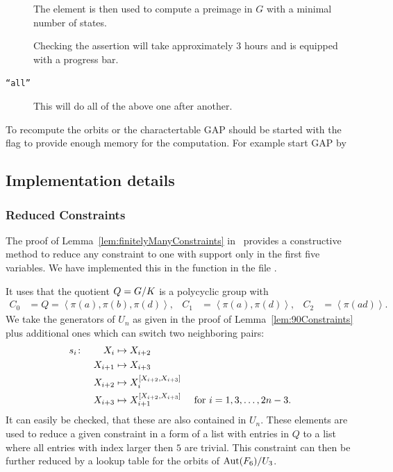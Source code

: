 \documentclass[a4paper,11pt]{amsart}
\begin{document}
\begin{description}
		      The element is then used to compute a preimage in $G$ with a minimal 
		      number of states.

		      Checking the assertion will take approximately $3$ hours and is equipped 
		      with a progress bar. 
  \item [\texttt{``all''}] This will do all of the above one after another.		      
   \end{description}
To recompute the orbits or the charactertable GAP should be 
started with the  flag
to provide enough memory for the computation. For example start GAP by 


\subsection{Implementation details}
\label{sec:gap_details}
\subsubsection{Reduced Constraints}
The proof of Lemma~\ref{lem:finitelyManyConstraints} in~\cite{Lysenok-Miasnikov-Ushakov:QuadraticEquationsInGrig} 
provides a constructive method to reduce any constraint to one with support
only in the first five variables. 
We have implemented this in the function  in the file
.

It uses that the quotient $Q={G/K}$ is a polycyclic group with 
\begin{align*}
 C_0 &= Q = \left<\pi(a),\pi(b),\pi(d)\right>, &
 C_1 &= \left<\pi(a),\pi(d)\right>, &
 C_2 &= \left<\pi(ad)\right>.
\end{align*}
We take the generators of $U_n$ as given in the proof of
 Lemma~\ref{lem:90Constraints}
plus additional ones which can switch two neighboring pairs:
\begin{align*}
 s_i &\colon &X_i&\mapsto X_{i+2}&\\
	    &&X_{i+1}&\mapsto X_{i+3}&\\
	    &&X_{i+2}&\mapsto X_{i}^{[X_{i+2},X_{i+3}]}&\\
	    &&X_{i+3}&\mapsto X_{i+1}^{[X_{i+2},X_{i+3}]} & \textup{ for }i = 1,3,\dotsc,2n-3.
\end{align*}
It can easily be checked, that these are also contained in $U_n$. 
These elements are used to reduce a given constraint in a form of 
a list with entries in $Q$ to a
list where all entries with index larger then $5$ are trivial. 
This constraint can then be further reduced by a lookup table for the orbits
of ${\operatorname{{Aut}}(F_6)/U_3}$. 
\end{document}
